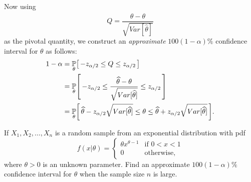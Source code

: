 Now using 
\[
Q = \frac{\widehat{\theta} - \theta}{\sqrt{Var[\widehat{\theta}]}}
\]
as the pivotal quantity, we construct an \textit{approximate} 
$100(1 - \alpha)\%$ confidence interval for $\theta$ as follows:
\begin{align*}
    1 - \alpha &= \uprob[\theta]{ -z_{\alpha / 2} \leq Q \leq z_{\alpha / 2} } \\
    &= \uprob[\theta]{ -z_{\alpha / 2} \leq \frac{\widehat{\theta} - \theta}{\sqrt{Var[\widehat{\theta}]}} \leq z_{\alpha / 2} } \\
    &= \uprob[\theta]{ \widehat{\theta} - z_{\alpha / 2} \sqrt{Var[\widehat{\theta}]} \leq \theta \leq \widehat{\theta} + z_{\alpha / 2} \sqrt{Var[\widehat{\theta}]} }.
\end{align*}

\begin{example}
    If $X_1, X_2, \ldots, X_n$ is a random sample from an exponential distribution with pdf
    \[
    f(x | \theta) = \begin{cases}
        \theta x^{\theta - 1} & \text{if } 0 < x < 1 \\
        0 & \text{otherwise,}
    \end{cases}
    \]
    where $\theta > 0$ is an unknown parameter. Find an approximate $100(1 - \alpha)\%$ confidence interval for $\theta$ when the sample size $n$ is large.
\end{example}
